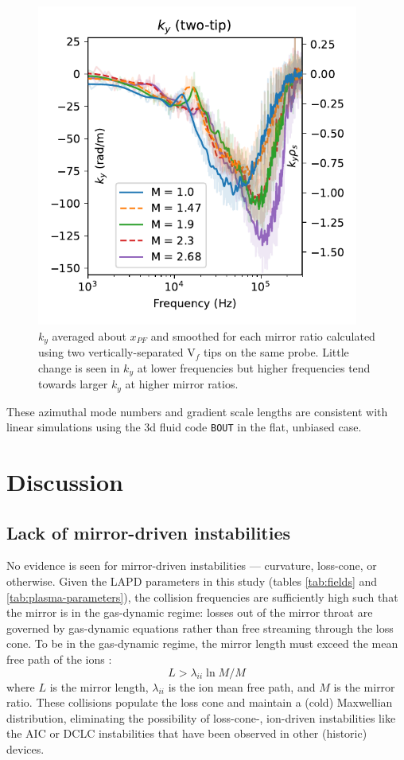 \begin{figure}
    \centering
    \includegraphics[width=300pt]{figures/fig18.pdf}
    \caption[$k_y$ averaged about $x_{PF}$]{$k_y$ averaged about $x_{PF}$ and smoothed for each mirror ratio calculated using two vertically-separated V$_f$ tips on the same probe. Little change is seen in $k_y$ at lower frequencies but higher frequencies tend towards larger $k_y$ at higher mirror ratios.}
    \label{fig:kperp}
\end{figure}
These azimuthal mode numbers and gradient scale lengths are consistent with linear simulations using the 3d fluid code \texttt{BOUT} \cite{Popovich_2010} in the flat, unbiased case.

\section{\label{sec:mirror-turb_discussion}Discussion}
\subsection{Lack of mirror-driven instabilities}
No evidence is seen for mirror-driven instabilities — curvature, loss-cone, or otherwise. Given the LAPD parameters in this study (tables \ref{tab:fields} and \ref{tab:plasma-parameters}), the collision frequencies are sufficiently high such that the mirror is in the gas-dynamic regime: losses out of the mirror throat are governed by gas-dynamic equations rather than free streaming through the loss cone. To be in the gas-dynamic regime, the mirror length must exceed the mean free path of the ions \cite{Ivanov_2013}:
\begin{equation}
    L > \lambda_{ii} \ln{M} / M
\end{equation}
where $L$ is the mirror length, $\lambda_{ii}$ is the ion mean free path, and $M$ is the mirror ratio.
These collisions populate the loss cone and maintain a (cold) Maxwellian distribution, eliminating the possibility of loss-cone-, ion-driven instabilities like the AIC \cite{Casper_1982} or DCLC \cite{Simonen_1976,Kanaev_1979} instabilities that have been observed in other (historic) devices. 

